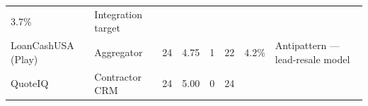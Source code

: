 \documentclass[
  10pt,
]{article}
\begin{document}
\begin{longtable}[]{@{}llllllll@{}}
\begin{minipage}[t]{0.10\columnwidth}
3.7\%\strut
\end{minipage} & \begin{minipage}[t]{0.10\columnwidth}\raggedright
Integration target\strut
\end{minipage}\tabularnewline
\begin{minipage}[t]{0.10\columnwidth}\raggedright
LoanCashUSA (Play)\strut
\end{minipage} & \begin{minipage}[t]{0.10\columnwidth}\raggedright
Aggregator\strut
\end{minipage} & \begin{minipage}[t]{0.10\columnwidth}\raggedright
24\strut
\end{minipage} & \begin{minipage}[t]{0.10\columnwidth}\raggedright
4.75\strut
\end{minipage} & \begin{minipage}[t]{0.10\columnwidth}\raggedright
1\strut
\end{minipage} & \begin{minipage}[t]{0.10\columnwidth}\raggedright
22\strut
\end{minipage} & \begin{minipage}[t]{0.10\columnwidth}\raggedright
4.2\%\strut
\end{minipage} & \begin{minipage}[t]{0.10\columnwidth}\raggedright
Antipattern --- lead-resale model\strut
\end{minipage}\tabularnewline
\begin{minipage}[t]{0.10\columnwidth}\raggedright
QuoteIQ\strut
\end{minipage} & \begin{minipage}[t]{0.10\columnwidth}\raggedright
Contractor CRM\strut
\end{minipage} & \begin{minipage}[t]{0.10\columnwidth}\raggedright
24\strut
\end{minipage} & \begin{minipage}[t]{0.10\columnwidth}\raggedright
5.00\strut
\end{minipage} & \begin{minipage}[t]{0.10\columnwidth}\raggedright
0\strut
\end{minipage} & \begin{minipage}[t]{0.10\columnwidth}\raggedright
24\strut
\end{minipage} & \begin{minipage}[t]{0.10\columnwidth}\raggedright

\end{minipage}
\end{longtable}
\end{document}
